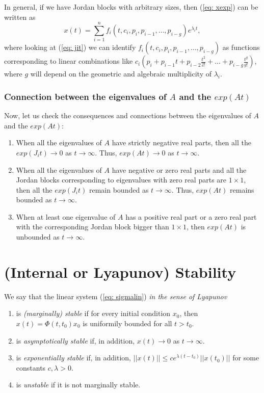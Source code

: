 \documentclass[11pt,a4paper,titlepage]{article}
\begin{document}
In general, if we have Jordan blocks with arbitrary sizes, then (\ref{eq: xexp}) can be written as
\begin{equation}
	x(t) = \sum_{i=1}^n f_i(t,c_i,p_i,p_{i-1},\dots,p_{i-g})e^{\lambda_i t},
\label{eq: solptcom}
\end{equation}
where looking at (\ref{eq: jit}) we can identify $f_i(t,c_i,p_i,p_{i-1},\dots,p_{i-g})$ as functions corresponding to linear combinations like $c_i(p_i + p_{i-1}t + p_{i-2}\frac{t^2}{2!}+\dots+p_{i-g}\frac{t^g}{g!})$, where $g$ will depend on the geometric and algebraic multiplicity of $\lambda_i$.

\subsubsection{Connection between the eigenvalues of $A$ and the $exp(At)$}
Now, let us check the consequences and connections between the eigenvalues of $A$ and the $exp(At)$:
\begin{enumerate}
	\item When all the eigenvalues of $A$ have strictly negative real parts, then all the $exp(J_it) \to 0$ as $t\to\infty$. Thus, $exp(At)\to 0 $ as $t\to\infty$.
	\item When all the eigenvalues of $A$ have negative or zero real parts and all the Jordan blocks corresponding to eigenvalues with zero real parts are $1\times 1$, then all the $exp(J_it)$ remain bounded as $t\to\infty$. Thus, $exp(At)$ remains bounded as $t\to\infty$.
	\item When at least one eigenvalue of $A$ has a positive real part or a zero real part with the corresponding Jordan block bigger than $1\times 1$, then $exp(At)$ is unbounded as $t\to\infty$.
\end{enumerate}

\section{(Internal or Lyapunov) Stability}
\label{sec: sta}

We say that the linear system (\ref{eq: sigmalin}) \emph{in the sense of Lyapunov}
\begin{enumerate}
	\item is \emph{(marginally) stable} if for every initial condition $x_0$, then $x(t) = \Phi(t,t_0) x_0$ is uniformily bounded for all $t>t_0$.
	\item is \emph{asymptotically stable} if, in addition, $x(t) \to 0$ as $t\to\infty$.
	\item is \emph{exponentially stable} if, in addition, $||x(t)|| \leq c e^{\lambda(t-t_0)}||x(t_0)||$ for some constants $c,\lambda > 0$.
	\item is \emph{unstable} if it is not marginally stable.
\end{enumerate}
\end{document}
